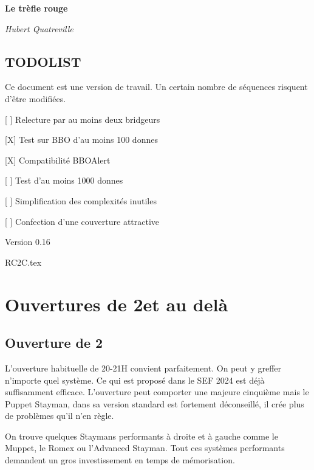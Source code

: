 \documentclass[a4paper,12pt, french]{book}
\begin{document}
 \begin{titlepage}
 \centering
 {\huge\bfseries Le trèfle rouge\par}

 {\Large\itshape Hubert Quatreville\par}
 \vfill
\end{titlepage}


\section*{TODOLIST}

Ce document est une version de travail.
Un certain nombre de séquences risquent d'être modifiées.

[ ] Relecture par au moins deux bridgeurs

[X] Test sur BBO d'au moins 100 donnes

[X] Compatibilité BBOAlert

[ ] Test d'au moins 1000 donnes

[ ] Simplification des complexités inutiles

[ ] Confection d'une couverture attractive

Version 0.16










 {RC2C.tex}

\chapter{Ouvertures de 2\NT et au delà}

\section*{Ouverture de 2\NT}

L'ouverture habituelle de 20-21H convient parfaitement.
On peut y greffer n'importe quel système. Ce qui est proposé dans le SEF 2024 est déjà suffisamment efficace. L'ouverture peut comporter une majeure cinquième mais le Puppet Stayman, dans sa version standard est fortement déconseillé, il crée plus de problèmes qu'il n'en règle.

On trouve quelques Staymans performants à droite et à gauche comme le Muppet, le Romex ou l'Advanced Stayman. Tout ces systèmes performants demandent un gros investissement en temps de mémorisation.
\end{document}
